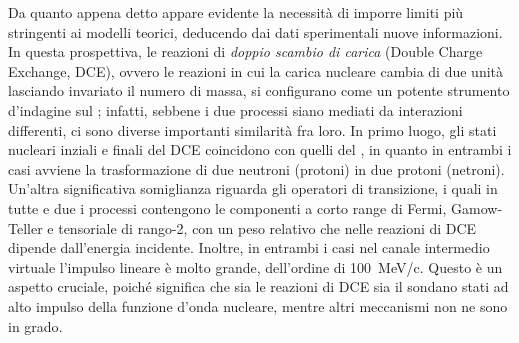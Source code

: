 Da quanto appena detto appare evidente la necessità di imporre limiti più stringenti ai modelli teorici, deducendo dai dati sperimentali nuove informazioni. 
In questa prospettiva, le reazioni di \emph{doppio scambio di carica} (Double Charge Exchange, DCE), ovvero le reazioni in cui la carica nucleare cambia di due unità lasciando invariato il numero di massa, si configurano come un potente strumento d'indagine sul \doppiobeta; 
infatti, sebbene i due processi siano mediati da interazioni differenti, ci sono diverse importanti similarità fra loro.
In primo luogo, gli stati nucleari inziali e finali del DCE coincidono con quelli del \doppiobeta{}, in quanto in entrambi i casi avviene la trasformazione di due neutroni (protoni) in due protoni (netroni). 
Un'altra significativa somiglianza riguarda gli operatori di transizione, i quali in tutte e due i processi contengono le componenti a corto range di Fermi, Gamow-Teller e tensoriale di rango-2, con un peso relativo che nelle reazioni di DCE dipende dall'energia incidente. 
Inoltre, in entrambi i casi nel canale intermedio virtuale l'impulso lineare è molto grande, dell'ordine di 100~MeV/c\cite{barea:prl12}. Questo è un aspetto cruciale, poiché significa che sia le reazioni di DCE sia il \doppiobeta{} sondano stati ad alto impulso della funzione d'onda nucleare, mentre altri meccanismi non ne sono in grado\cite{puppe:prc11}.

